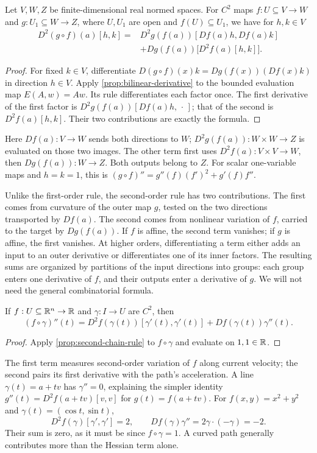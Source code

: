 \begin{proposition}\label{prop:second-chain-rule}
Let $V,W,Z$ be finite-dimensional real normed spaces.
For $C^2$ maps $f:U\subseteq V\to W$ and $g:U_1\subseteq W\to Z$,
where $U,U_1$ are open and $f(U)\subseteq U_1$, we have for $h,k\in V$
\[
\begin{split}
D^2(g\circ f)(a)[h,k]={}&D^2g(f(a))[Df(a)h,Df(a)k]\\
&+Dg(f(a))\bigl[D^2f(a)[h,k]\bigr].
\end{split}
\]
\end{proposition}
\begin{proof}
For fixed $k\in V$, differentiate
$D(g\circ f)(x)k=Dg(f(x))(Df(x)k)$ in direction $h\in V$.
Apply \cref{prop:bilinear-derivative} to the bounded evaluation map
$E(A,w)=Aw$. Its rule differentiates each factor once. The first derivative of the first factor is
$D^2g(f(a))[Df(a)h,\,\cdot\,]$; that of the second is
$D^2f(a)[h,k]$. Their two contributions are exactly the formula.
\end{proof}
Here $Df(a):V\to W$ sends both directions to $W$;
$D^2g(f(a)):W\times W\to Z$ is evaluated on those two images.
The other term first uses $D^2f(a):V\times V\to W$, then
$Dg(f(a)):W\to Z$. Both outputs belong to $Z$. For scalar one-variable
maps and $h=k=1$, this is $(g\circ f)''=g''(f)(f')^2+g'(f)f''$.

Unlike the first-order rule, the second-order rule has two contributions.
The first comes from curvature of the outer map $g$, tested on the two
directions transported by $Df(a)$. The second comes from nonlinear
variation of $f$, carried to the target by $Dg(f(a))$. If $f$ is affine,
the second term vanishes; if $g$ is affine, the first vanishes.
At higher orders, differentiating a term either adds an input to an outer
derivative or differentiates one of its inner factors. The resulting sums
are organized by partitions of the input directions into groups: each
group enters one derivative of $f$, and their outputs enter a derivative
of $g$. We will not need the general combinatorial formula.

\begin{corollary}\label{cor:curved-second-derivative}
If $f:U\subseteq\mathbb{R}^n\to\mathbb{R}$ and $\gamma:I\to U$ are $C^2$, then
\[
(f\circ\gamma)''(t)
=D^2f(\gamma(t))[\gamma'(t),\gamma'(t)]
 +Df(\gamma(t))\gamma''(t).
\]
\end{corollary}
\begin{proof}
Apply \cref{prop:second-chain-rule} to $f\circ\gamma$ and evaluate on
$1,1\in\mathbb{R}$.
\end{proof}
The first term measures second-order variation of $f$ along current velocity;
the second pairs its first derivative with the path's acceleration.
A line $\gamma(t)=a+tv$ has $\gamma''=0$, explaining the simpler identity
$g''(t)=D^2f(a+tv)[v,v]$ for $g(t)=f(a+tv)$.
For $f(x,y)=x^2+y^2$ and $\gamma(t)=(\cos t,\sin t)$,
\[
D^2f(\gamma)[\gamma',\gamma']=2,\qquad
Df(\gamma)\gamma''=2\gamma\cdot(-\gamma)=-2.
\]
Their sum is zero, as it must be since $f\circ\gamma=1$. A curved path
generally contributes more than the Hessian term alone.

